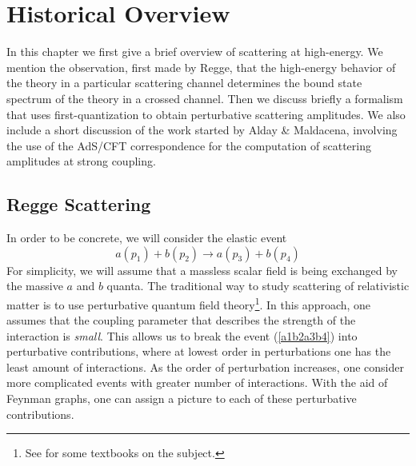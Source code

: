 \chapter{Historical Overview\label{ChHist}}
In this chapter we first give a brief overview of scattering at high-energy. We mention the observation, first made by Regge, that the high-energy behavior of the theory in a particular scattering channel determines the bound state spectrum of the theory in a crossed channel. Then we discuss briefly a formalism that uses first-quantization to obtain perturbative scattering amplitudes. We also include a short discussion of the work started by Alday \& Maldacena, involving the use of the AdS/CFT correspondence for the computation of scattering amplitudes at strong coupling.
\section{Regge Scattering\label{ReggeSca}}
In order to be concrete, we will consider the elastic event
\begin{equation}
	a(p_{1}) + b(p_{2}) \longrightarrow a(p_{3}) + b(p_{4}) \label{a1b2a3b4}
\end{equation}
For simplicity, we will assume that a massless scalar field is being exchanged by the massive $a$ and $b$ quanta. The traditional way to study scattering of relativistic matter is to use perturbative quantum field theory\footnote{See \cite{Fields,Srednicki,Sterman} for some textbooks on the subject.}. In this approach, one assumes that the coupling parameter that describes the strength of the interaction is \textit{small}. This allows us to break the event (\ref{a1b2a3b4}) into perturbative contributions, where at lowest order in perturbations one has the least amount of interactions. As the order of perturbation increases, one consider more complicated events with greater number of interactions. With the aid of Feynman graphs, one can assign a picture to each of these perturbative contributions.

